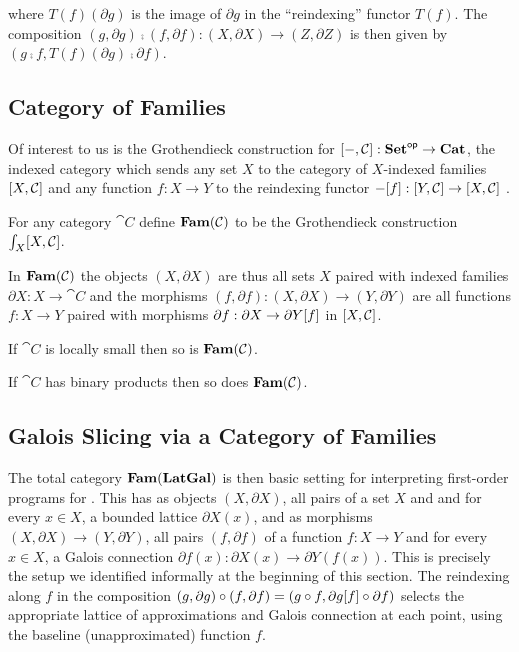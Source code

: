 \noindent where $T(f)(\partial g)$ is the image of $\partial g$ in the ``reindexing'' functor $T(f)$. The
composition $(g, \partial g) \comp (f, \partial f): (X, \partial X) \to (Z, \partial Z)$ is then given by $(g
\comp f, T(f)(\partial g) \comp \partial f)$.

\subsection{Category of Families}
\label{sec:Fam}

Of interest to us is the Grothendieck construction for $[-,\mathcal{C}]: \mathbf{Set}^{\mathsf{op}} \to \mathbf{Cat}$, the indexed
category which sends any set $X$ to the category of $X$-indexed families $[X,\mathcal{C}]$ and any function
$f: X \to Y$ to the reindexing functor $-[f]: [Y,\mathcal{C}] \to [X,\mathcal{C}]$ .

\begin{definition}
\label{def:Fam}
For any category $\cat{C}$ define $\mathbf{Fam}(\mathcal{C})$ to be the Grothendieck construction
$\int_{X}[X,\mathcal{C}]$.
\end{definition}

\noindent In $\mathbf{Fam}(\mathcal{C})$ the objects $(X, \partial X)$ are thus all sets $X$ paired with indexed families
$\partial X: X \to \cat{C}$ and the morphisms $(f, \partial f): (X, \partial X) \to (Y, \partial Y)$ are all
functions $f: X \to Y$ paired with morphisms $\partial f: \partial X \to \partial Y[f]$ in
$[X,\mathcal{C}]$.

\begin{proposition}
\label{prop:Grothendieck:fam-inherits-local-smallness}
If $\cat{C}$ is locally small then so is $\mathbf{Fam}(\mathcal{C})$.
\end{proposition}

\begin{proposition}
\label{prop:Grothendieck:fam-inherits-products}
If $\cat{C}$ has binary products then so does $\mathbf{Fam}(\mathcal{C})$.
\end{proposition}

\subsection{Galois Slicing via a Category of Families}
\label{sec:fam:galois-slicing}

The total category $\mathbf{Fam}(\mathbf{LatGal})$ is then basic setting for interpreting first-order programs for \GPS. This
has as objects $(X, \partial X)$, all pairs of a set $X$ and and for every $x \in X$, a bounded lattice
$\partial X(x)$, and as morphisms $(X, \partial X) \to (Y, \partial Y)$, all pairs $(f, \partial f)$ of a
function $f: X \to Y$ and for every $x \in X$, a Galois connection $\partial f(x): \partial X(x) \to \partial
Y(f(x))$. This is precisely the setup we identified informally at the beginning of this section. The
reindexing along $f$ in the composition $(g, \partial g) \circ (f, \partial f) = (g \circ f, \partial
g[f] \circ \partial f)$ selects the appropriate lattice of approximations and Galois connection at each
point, using the baseline (unapproximated) function $f$.

